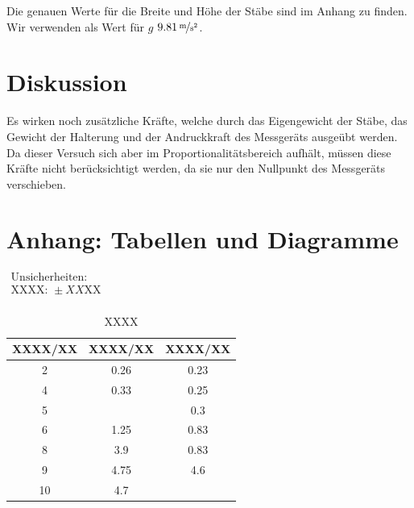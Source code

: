 \documentclass[11pt,a4paper]{article}
\begin{document}
Die genauen Werte f\"ur die Breite und H\"ohe der St\"abe sind im Anhang zu finden. Wir verwenden als Wert f\"ur $g$ $9.81\,\nicefrac{\mathrm{m}}{\mathrm{s}^2}$.

\section{Diskussion}

Es wirken noch zus\"atzliche Kr\"afte, welche durch das Eigengewicht der St\"abe, das Gewicht der Halterung und der Andruckkraft des Messger\"ats ausge\"ubt werden. Da dieser Versuch sich aber im Proportionalit\"atsbereich aufh\"alt, m\"ussen diese Kr\"afte nicht ber\"ucksichtigt werden, da sie nur den Nullpunkt des Messger\"ats verschieben.

\pagebreak

\section{Anhang: Tabellen und Diagramme}

\begin{table}[h]
\centering
\caption{XXXX} \vspace{11pt}
$\begin{array}{l}
\textrm{Unsicherheiten:}\\
\textrm{XXXX: } \pm XX \textrm{XX}\\
\end{array}$
\begin{tabular}{ccc}
\toprule
\textrm{XXXX}/\textrm{XX} & \textrm{XXXX}/\textrm{XX} & \textrm{XXXX}/\textrm{XX} \\
\midrule 
2 & 0.26 & 0.23\\
\hline
4 & 0.33 & 0.25\\
\hline 
5 & & 0.3\\
\hline 
6 & 1.25 & 0.83\\
\hline 
8 & 3.9 & 0.83\\ 
\hline
9 & 4.75 & 4.6\\ 
\hline
10 & 4.7 &\\ 
\bottomrule
\end{tabular}
\label{Tab:X}
\end{table}

\end{document}

